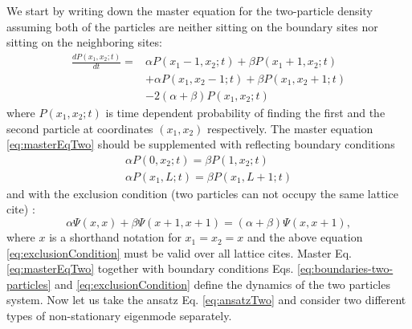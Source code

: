 \documentclass[aps,showpacs,twocolumn,floatfix,prx,superscriptaddress]{revtex4-1}
\begin{document}
We start by writing down the master equation for the two-particle density assuming both of the particles are neither sitting on the boundary sites nor sitting on the neighboring sites:
\begin{equation}
    \begin{aligned}
    \label{eq:masterEqTwo}
    \frac{d P(x_1, x_2; t)}{dt} = & \alpha P(x_1-1,x_2;t) + \beta P(x_1+1,x_2;t) \\ 
    & + \alpha P(x_1, x_2-1; t) + \beta P(x_1, x_2+1; t)  \\ 
    & - 2(\alpha+\beta)P(x_1, x_2; t)
    \end{aligned}
\end{equation}
where $P(x_1, x_2; t)$ is time dependent probability of finding the first and the second particle  at coordinates $(x_1, x_2)$ respectively. The master equation \ref{eq:masterEqTwo} should be supplemented with reflecting boundary conditions \cite{} 
\begin{subequations}
    \label{eq:boundaries-two-particles}
    \begin{eqnarray}
        \alpha P(0,x_2;t) = \beta P(1, x_2;t) \\
        \alpha P(x_1, L;t) = \beta P(x_1, L+1;t)
    \end{eqnarray}
\end{subequations}
and with the exclusion condition (two particles can not occupy the same lattice cite) \cite{}: %
\begin{equation}
    \label{eq:exclusionCondition}
    \alpha \Psi(x, x) + \beta \Psi(x+1, x+1) = (\alpha + \beta) \Psi(x, x+1),
\end{equation}
where $x$ is a shorthand notation for $x_1=x_2=x$ and the above equation \eqref{eq:exclusionCondition} must be valid over all lattice cites.
Master Eq. \eqref{eq:masterEqTwo} together with boundary conditions Eqs. \eqref{eq:boundaries-two-particles} and \eqref{eq:exclusionCondition} define the dynamics of the two particles system. Now let us take the ansatz Eq. \eqref{eq:ansatzTwo} and consider two different types of non-stationary eigenmode separately. 
\end{document}
